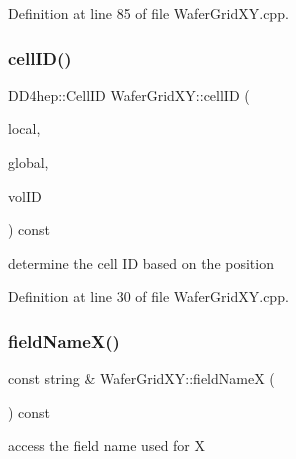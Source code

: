 Definition at line 85 of file Wafer\+Grid\+X\+Y.\+cpp.

\hypertarget{class_d_d4hep_1_1_geometry_1_1_wafer_grid_x_y_a76a056c88d1711ba099c220db7e54a98}{}\label{class_d_d4hep_1_1_geometry_1_1_wafer_grid_x_y_a76a056c88d1711ba099c220db7e54a98} 
\subsubsection{\texorpdfstring{cell\+I\+D()}{cellID()}}
{\footnotesize\ttfamily D\+D4hep\+::\+Cell\+ID Wafer\+Grid\+X\+Y\+::cell\+ID (\begin{DoxyParamCaption}\item[{const \hyperlink{namespace_d_d4hep_1_1_geometry_a55083902099d03506c6db01b80404900}{Position} \&}]{local,  }\item[{const \hyperlink{namespace_d_d4hep_1_1_geometry_a55083902099d03506c6db01b80404900}{Position} \&}]{global,  }\item[{const Volume\+ID \&}]{vol\+ID }\end{DoxyParamCaption}) const}



determine the cell ID based on the position 



Definition at line 30 of file Wafer\+Grid\+X\+Y.\+cpp.

\hypertarget{class_d_d4hep_1_1_geometry_1_1_wafer_grid_x_y_a9fb866a3ebbae07ab7c1c9523310bfa4}{}\label{class_d_d4hep_1_1_geometry_1_1_wafer_grid_x_y_a9fb866a3ebbae07ab7c1c9523310bfa4} 
\subsubsection{\texorpdfstring{field\+Name\+X()}{fieldNameX()}}
{\footnotesize\ttfamily const string \& Wafer\+Grid\+X\+Y\+::field\+NameX (\begin{DoxyParamCaption}{ }\end{DoxyParamCaption}) const}



access the field name used for X 




